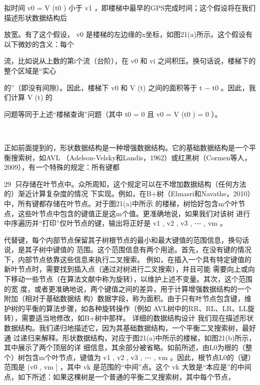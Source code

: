 拟时间 v0 = V (t0 ) 小于 v1 ，即楼梯中最早的GPS完成时间；这个假设将在我们描述形状数据结构后
                                                           ​




放宽。有了这个假设， v0 是楼梯的左边缘的x坐标，如图21(a)所示。这个假设有以下微妙的含义：每个
      ​    ​       ​




流，比如说从上数的第i个流（台阶），在 v0 和 vi 之间积压。换句话说，楼梯下的整个区域是“实心
               ​




的”（即没有间隙）。因此，楼梯下 v0 和 V (t) 之间的面积等于 t − t0 。因此，我们计算 V (t) 的
                               ​   ​




问题等同于上述“楼梯查询”问题（其中 t0 = 0 且 v0 = V (t0 ) = 0 ）。
                       ​                       ​




                           ​           ​   ​




正如前面提到的，形状数据结构是一种增强数据结构。它的基础数据结构是一个平衡搜索树，如AVL
（Adelson-Velsky和Landis，1962）或红黑树（Cormen等人，2009），有一个特殊的规定：所有键都

                                                                   29
只存储在叶节点中。众所周知，这个规定可以在不增加数据结构（任何方法的）渐近计算复杂度的情况
下实现。例如，在B+树（Elmasri和Navathe，2010）中，所有键都存储在叶节点。对于图21(a)中所示
的楼梯，树恰好包含m个叶节点，这些叶节点中包含的键值正是这m个值。更准确地说，如果我们对该树
进行中序遍历并“打印”仅叶节点的键，输出将正好是 v1 , v2 , v3 , ⋯ , vm 。                  ​   ​           ​                   ​




代替键，每个内部节点保留其子树根节点的最小和最大键值的范围信息，换句话说，是其子树中键值的
范围。这个范围信息有两个用途。首先，在没有键的情况下，内部节点依靠这些信息来执行二叉搜索。
例如，在插入一个具有特定键值的新叶节点时，需要找到插入点（通过对树进行二叉搜索），并且可能
需要向上或向下移动一些节点（在算法文献中称为旋转），以维护上述不变量。其次，这个范围的宽
度，或者更准确地说，两个键值之间的差异，用于计算增强数据结构的一个附加（相对于基础数据结
构）数据字段，称为面积。由于只有叶节点包含键，维护树的平衡的算法步骤，如各种旋转操作（例如
AVL树中的RR、RL、LR、LL旋转），需要适当地修改，如B+树中那样。
详细的数据结构设计
我们现在描述形状数据结构。我们递归地描述它，因为其基础数据结构，一个平衡二叉搜索树，最好通
过递归来解释。形状数据结构，对应于图21(a)中所示的楼梯，如图21(b)所示，其中展示了两个顶层的详
细信息，其余部分被省略。如前所述，由L0为根的（整个）树包含m个叶节点，键值为
 v1 , v2 , v3 , ⋯ , vm 。因此，根节点L0的（键）范围是 (v0 , vm ] ，其中 vk 是范围的“中间”点。这个
 vk 大致是“本应是”的中间点，如下所述：如果这棵树是一个普通的平衡二叉搜索树，其中每个节点，
  ​               ​       ​       ​                                       ​                       ​           ​





